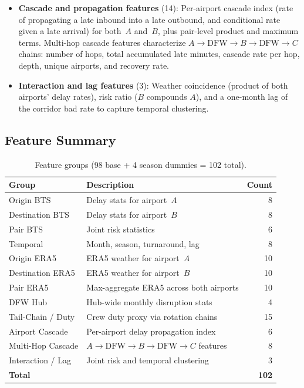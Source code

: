 \documentclass[11pt, twoside]{article}
\begin{document}
\begin{itemize}[leftmargin=*, itemsep=3pt, topsep=3pt]
  \item \textbf{Cascade and propagation features} (14): Per-airport cascade
        index (rate of propagating a late inbound into a late outbound, and
        conditional rate given a late arrival) for both~$A$ and~$B$, plus
        pair-level product and maximum terms.  Multi-hop cascade features
        characterize $A\to\text{DFW}\to B\to\text{DFW}\to C$ chains: number
        of hops, total accumulated late minutes, cascade rate per hop, depth,
        unique airports, and recovery rate.
  \item \textbf{Interaction and lag features} (3): Weather coincidence
        (product of both airports' delay rates), risk ratio ($B$ compounds
        $A$), and a one-month lag of the corridor bad rate to capture temporal
        clustering.
\end{itemize}

\subsection{Feature Summary}

\begin{table}[!htbp]
\centering
\caption{Feature groups (98 base + 4 season dummies = 102 total).}
\label{tab:feature_summary}
\begin{tabular}{llr}
\toprule
Group & Description & Count \\
\midrule
Origin BTS & Delay stats for airport~$A$ & 8 \\
Destination BTS & Delay stats for airport~$B$ & 8 \\
Pair BTS & Joint risk statistics & 6 \\
Temporal & Month, season, turnaround, lag & 8 \\
Origin ERA5 & ERA5 weather for airport~$A$ & 10 \\
Destination ERA5 & ERA5 weather for airport~$B$ & 10 \\
Pair ERA5 & Max-aggregate ERA5 across both airports & 10 \\
DFW Hub & Hub-wide monthly disruption stats & 4 \\
Tail-Chain / Duty & Crew duty proxy via rotation chains & 15 \\
Airport Cascade & Per-airport delay propagation index & 6 \\
Multi-Hop Cascade & $A\to\text{DFW}\to B\to\text{DFW}\to C$ features & 8 \\
Interaction / Lag & Joint risk and temporal clustering & 3 \\
\midrule
\textbf{Total} & & \textbf{102} \\
\bottomrule
\end{tabular}
\end{table}
\end{document}
